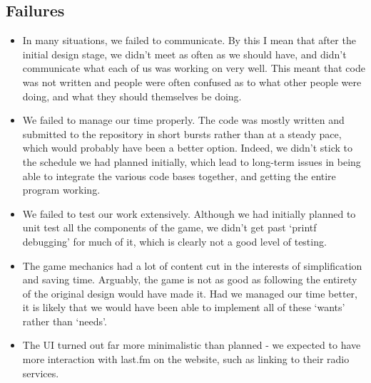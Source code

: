 \documentclass[a4paper,10pt,twoside]{article}
\begin{document}
\subsection{Failures}
\begin{itemize}
\item In many situations, we failed to communicate. By this I mean that after the initial design stage, we didn't meet as often as we should have, and didn't communicate what each of us was working on very well. This meant that code was not written and people were often confused as to what other people were doing, and what they should themselves be doing.
\item We failed to manage our time properly. The code was mostly written and submitted to the repository in short bursts rather than at a steady pace, which would probably have been a better option. Indeed, we didn't stick to the schedule we had planned initially, which lead to long-term issues in being able to integrate the various code bases together, and getting the entire program working.
\item We failed to test our work extensively. Although we had initially planned to unit test all the components of the game, we didn't get past `printf debugging' for much of it, which is clearly not a good level of testing.
\item The game mechanics had a lot of content cut in the interests of simplification and saving time. Arguably, the game is not as good as following the entirety of the original design would have made it. Had we managed our time better, it is likely that we would have been able to implement all of these `wants' rather than `needs'.
\item The UI turned out far more minimalistic than planned - we expected to have more interaction with last.fm on the website, such as linking to their radio services.
\end{itemize}
\end{document}
